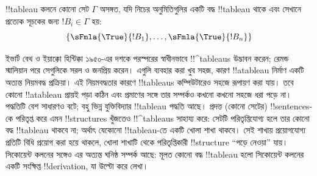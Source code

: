 \documentclass[../../../include/open-logic-section]{subfiles}
\begin{document}
!!{tableau} কলনে কোনো সেট $\Gamma$ অসঙ্গত, যদি নিচের অনুমিতিগুলির
একটি বদ্ধ !!{tableau} থাকে এবং সেখানে প্রত্যেক সূচকের জন্য
$!B_i \in \Gamma$ হয়:
\[
\{\sFmla{\True}{!B_1}, \dots, \sFmla{\True}{!B_n}\}
\]


ইভার্ট বেথ ও ইয়াক্কো হিন্টিক্কা ১৯৫০-এর দশকে পরস্পরের স্বাধীনভাবে
!!^{tableau}s উদ্ভাবন করেন; রেমন্ড স্মালিয়ান পরে সেগুলিকে সরল ও
জনপ্রিয় করেন। এগুলি ব্যবহার করা খুব সহজ, কারণ !!a{tableau} নির্মাণ
একটি অত্যন্ত নিয়মবদ্ধ প্রক্রিয়া। এই নিয়মবদ্ধতার কারণে
!!{tableau}s কম্পিউটারেও সহজে রূপায়ণ করা যায়। তবে কোনো !!a{tableau}
প্রায়ই পড়া কঠিন এবং প্রমাণের সঙ্গে তার সম্পর্কও কখনো কখনো সহজে ধরা
পড়ে না। পদ্ধতিটি বেশ সাধারণও বটে; বহু ভিন্ন যুক্তিবিদ্যার
!!{tableau} পদ্ধতি আছে। প্রদত্ত (কোনো সেটের) !!{sentence}s-কে
পরিতৃপ্ত করে এমন !!{structure}s খুঁজতেও !!^{tableau}s সাহায্য করে:
সেটটি পরিতৃপ্তিযোগ্য হলে তার কোনো বদ্ধ !!{tableau} থাকবে না; অর্থাৎ
যেকোনো !!{tableau}-তে একটি খোলা শাখা থাকবে। সেই শাখায় প্রয়োগযোগ্য
প্রতিটি বিধি প্রয়োগ করা হয়ে থাকলে, খোলা শাখাটি থেকে পরিতৃপ্তিকারী
!!{structure} “পড়ে নেওয়া” যায়। সিকোয়েন্ট কলনের সঙ্গেও এর অত্যন্ত
ঘনিষ্ঠ সম্পর্ক আছে: মূলত কোনো বদ্ধ !!{tableau} হলো সিকোয়েন্ট কলনের
একটি সংক্ষিপ্ত !!{derivation}, যা উল্টো করে লেখা।
\end{document}
